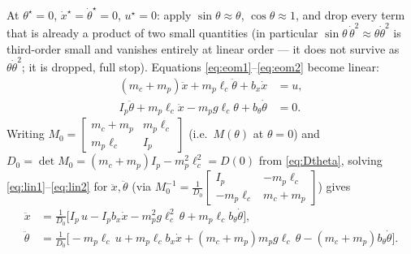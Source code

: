 \documentclass[11pt]{article}
\begin{document}
At $\theta^\star=0$, $\dot x^\star=\dot\theta^\star=0$, $u^\star=0$: apply
$\sin\theta\approx\theta$, $\cos\theta\approx1$, and drop every term that
is already a product of two small quantities (in particular
$\sin\theta\,\dot\theta^2 \approx \theta\dot\theta^2$ is third-order small
and vanishes entirely at linear order — it does not survive as
$\theta\dot\theta^2$; it is dropped, full stop). Equations
\eqref{eq:eom1}--\eqref{eq:eom2} become linear:
\begin{align}
  (m_c+m_p)\ddot x + m_p\ell_c\ddot\theta + b_x\dot x &= u,
  \label{eq:lin1}\\
  I_p\ddot\theta + m_p\ell_c\ddot x - m_p g\ell_c\theta + b_\theta\dot\theta
  &= 0. \label{eq:lin2}
\end{align}
Writing $M_0 = \begin{bmatrix} m_c+m_p & m_p\ell_c\\ m_p\ell_c & I_p
\end{bmatrix}$ (i.e.\ $M(\theta)$ at $\theta=0$) and $D_0 = \det M_0 =
(m_c+m_p)I_p - m_p^2\ell_c^2 = D(0)$ from \eqref{eq:Dtheta}, solving
\eqref{eq:lin1}--\eqref{eq:lin2} for $\ddot x,\ddot\theta$
(via $M_0^{-1} = \frac{1}{D_0}\begin{bmatrix} I_p & -m_p\ell_c \\
-m_p\ell_c & m_c+m_p\end{bmatrix}$) gives
\begin{align}
  \ddot x &= \frac{1}{D_0}\Big[I_p\,u - I_p b_x\dot x
  - m_p^2 g\ell_c^2\,\theta + m_p\ell_c b_\theta\dot\theta\Big],
  \label{eq:linxddot}\\
  \ddot\theta &= \frac{1}{D_0}\Big[-m_p\ell_c\,u + m_p\ell_c b_x\dot x
  + (m_c+m_p)m_p g\ell_c\,\theta - (m_c+m_p)b_\theta\dot\theta\Big].
  \label{eq:linthetaddot}
\end{align}
\end{document}
